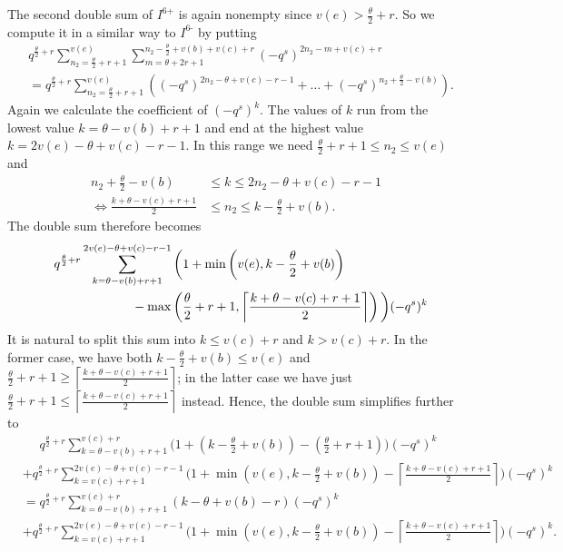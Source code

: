 The second double sum of $I^{\text{6+}}$ is again nonempty
since $v(e) > \frac{\theta}{2} + r$.
So we compute it
in a similar way to $I^{\text{6-}}$ by putting
\begin{align*}
  &q^{\frac{\theta}{2} + r} \sum_{n_2 = \frac{\theta}{2} + r + 1}^{v(e)}
  \sum_{m = \theta + 2r + 1}^{n_2 - \frac{\theta}{2} + v(b) + v(c) + r}
    (-q^s)^{2n_2 - m + v(c) + r} \\
  &= q^{\frac{\theta}{2} + r} \sum_{n_2 = \frac{\theta}{2} + r + 1}^{v(e)}
  \left(
    (-q^s)^{2n_2 - \theta + v(c) - r - 1}
    + \dots
    + (-q^s)^{n_2 + \frac{\theta}{2} - v(b)}
  \right).
\end{align*}
Again we calculate the coefficient of $(-q^s)^k$.
The values of $k$ run from the lowest value $k = \theta - v(b) + r + 1$
and end at the highest value $k = 2v(e) - \theta + v(c) - r - 1$.
In this range we need $\frac{\theta}{2} + r + 1 \le n_2 \le v(e)$ and
\begin{align*}
  n_2 + \frac{\theta}{2} - v(b) &\le k \le 2n_2 - \theta + v(c) - r - 1 \\
  \iff \frac{k + \theta - v(c) + r + 1}{2} &\le n_2 \le k - \frac{\theta}{2} + v(b).
\end{align*}
The double sum therefore becomes
\begin{align*}
  &\phantom=
  q^{\frac{\theta}{2} + r}
  \sum_{k = \theta - v(b) + r + 1}^{2v(e) - \theta + v(c) - r - 1}
  \bigg( 1 + \min\left( v(e), k - \frac{\theta}{2} + v(b) \right) \\
    &\hspace{16ex} - \max\left( \frac{\theta}{2} + r + 1,
      \left\lceil \frac{k + \theta - v(c) + r + 1}{2} \right\rceil \right) \bigg) (-q^s)^k
\end{align*}
It is natural to split this sum into $k \le v(c) + r$ and $k > v(c) + r$.
In the former case, we have both $k - \frac{\theta}{2} + v(b) \le v(e)$
and $\frac{\theta}{2} + r + 1 \ge \left\lceil \frac{k + \theta - v(c) + r + 1}{2} \right\rceil$;
in the latter case we have just
$\frac{\theta}{2} + r + 1 \le \left\lceil \frac{k + \theta - v(c) + r + 1}{2} \right\rceil$
instead.
Hence, the double sum simplifies further to
\begin{align*}
  &\phantom= q^{\frac{\theta}{2} + r}
  \sum_{k = \theta - v(b) + r + 1}^{v(c) + r}
  \bigg( 1 + \left( k - \frac{\theta}{2} + v(b) \right)
    - \left( \frac{\theta}{2} + r + 1 \right) \bigg) (-q^s)^k \\
  &+ q^{\frac{\theta}{2} + r}
  \sum_{k = v(c) + r + 1}^{2v(e) - \theta + v(c) - r - 1}
  \bigg( 1 + \min\left( v(e), k - \frac{\theta}{2} + v(b) \right)
    - \left\lceil \frac{k + \theta - v(c) + r + 1}{2} \right\rceil \bigg) (-q^s)^k \\
  &= q^{\frac{\theta}{2} + r}
  \sum_{k = \theta - v(b) + r + 1}^{v(c) + r}
  \left( k - \theta + v(b) - r \right) (-q^s)^k \\
  &+ q^{\frac{\theta}{2} + r}
  \sum_{k = v(c) + r + 1}^{2v(e) - \theta + v(c) - r - 1}
  \bigg( 1 + \min\left( v(e), k - \frac{\theta}{2} + v(b) \right)
    - \left\lceil \frac{k + \theta - v(c) + r + 1}{2} \right\rceil \bigg) (-q^s)^k.
\end{align*}
